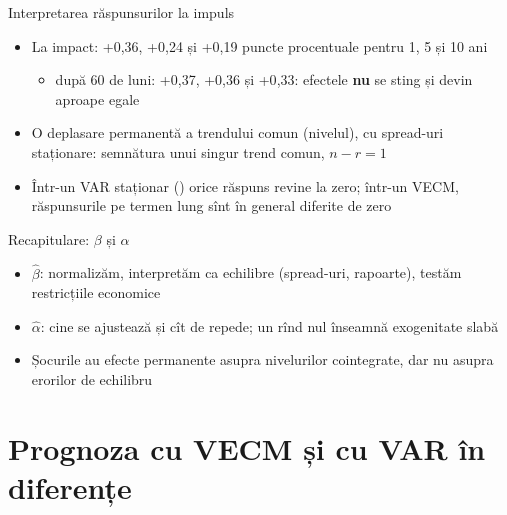 \begin{frame}{Interpretarea răspunsurilor la impuls}
\itemsize{\small}
\begin{itemize}
    \item La impact: +0{,}36, +0{,}24 și +0{,}19 puncte procentuale pentru 1, 5 și 10 ani
    \begin{itemize}
        \item după 60 de luni: +0{,}37, +0{,}36 și +0{,}33: efectele \textbf{nu} se sting și devin aproape egale
    \end{itemize}
    \item O deplasare permanentă a trendului comun (nivelul), cu spread-uri staționare: semnătura unui singur trend comun, $n - r = 1$
    \item Într-un VAR staționar () orice răspuns revine la zero; într-un VECM, răspunsurile pe termen lung sînt în general diferite de zero
\end{itemize}
\end{frame}

\begin{frame}{Recapitulare: $\beta$ și $\alpha$}
\itemsize{\small}
\begin{itemize}
    \item $\hat\beta$: normalizăm, interpretăm ca echilibre (spread-uri, rapoarte), testăm restricțiile economice
    \item $\hat\alpha$: cine se ajustează și cît de repede; un rînd nul înseamnă exogenitate slabă
    \item Șocurile au efecte permanente asupra nivelurilor cointegrate, dar nu asupra erorilor de echilibru
\end{itemize}
\end{frame}


\section{Prognoza cu VECM și cu VAR în diferențe}

